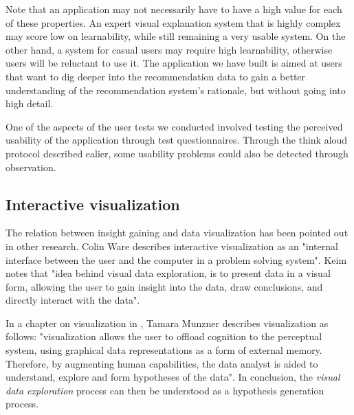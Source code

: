 Note that an application may not necessarily have to have a high value for each of these properties. An expert visual explanation system that is highly complex may score low on learnability, while still remaining a very usable system. On the other hand, a system for casual users may require high learnability, otherwise users will be reluctant to use it. The application we have built is aimed at users that want to dig deeper into the recommendation data to gain a better understanding of the recommendation system's rationale, but without going into high detail.

One of the aspects of the user tests we conducted involved testing the perceived usability of the application through test questionnaires. Through the think aloud protocol described ealier, some usability problems could also be detected through observation.


















\subsection{Interactive visualization}\label{chapter:literature_study:section:user:subsection:interactive}


The relation between insight gaining and data visualization has been pointed out in other research. Colin Ware \cite{ware:2004} describes interactive visualization as an "internal interface between the user and the computer in a problem solving system". Keim \cite{keim:2002} notes that "idea behind visual data exploration, is to present data in a visual form, allowing the user to gain insight into the data, draw conclusions, and directly interact with the data".

In a chapter on visualization in \cite{shirley:2009}, Tamara Munzner describes visualization as follows: "visualization allows the user to offload cognition to the perceptual system, using graphical data representations as a form of external memory. Therefore, by augmenting human capabilities, the data analyst is aided to understand, explore and form hypotheses of the data"\cite{shirley:2009}. In conclusion, the \emph{visual data exploration} process can then be understood as a hypothesis generation process\cite{keim:2002}.

